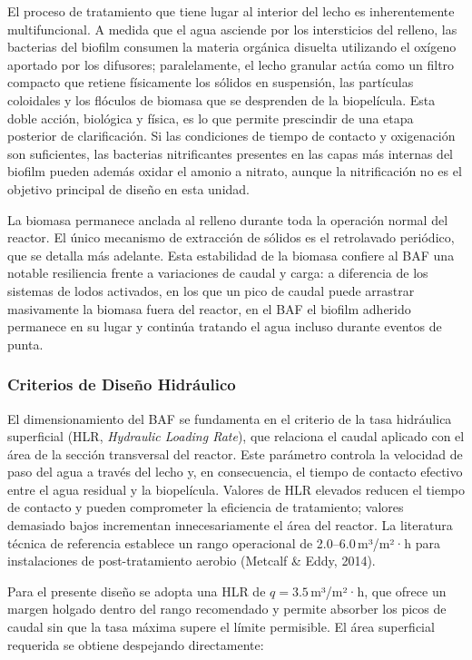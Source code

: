 El proceso de tratamiento que tiene lugar al interior del lecho es inherentemente multifuncional. A medida que el agua asciende por los intersticios del relleno, las bacterias del biofilm consumen la materia orgánica disuelta utilizando el oxígeno aportado por los difusores; paralelamente, el lecho granular actúa como un filtro compacto que retiene físicamente los sólidos en suspensión, las partículas coloidales y los flóculos de biomasa que se desprenden de la biopelícula. Esta doble acción, biológica y física, es lo que permite prescindir de una etapa posterior de clarificación. Si las condiciones de tiempo de contacto y oxigenación son suficientes, las bacterias nitrificantes presentes en las capas más internas del biofilm pueden además oxidar el amonio a nitrato, aunque la nitrificación no es el objetivo principal de diseño en esta unidad.

La biomasa permanece anclada al relleno durante toda la operación normal del reactor. El único mecanismo de extracción de sólidos es el retrolavado periódico, que se detalla más adelante. Esta estabilidad de la biomasa confiere al BAF una notable resiliencia frente a variaciones de caudal y carga: a diferencia de los sistemas de lodos activados, en los que un pico de caudal puede arrastrar masivamente la biomasa fuera del reactor, en el BAF el biofilm adherido permanece en su lugar y continúa tratando el agua incluso durante eventos de punta.

\subsubsection*{Criterios de Diseño Hidráulico}

El dimensionamiento del BAF se fundamenta en el criterio de la tasa hidráulica superficial (HLR, \textit{Hydraulic Loading Rate}), que relaciona el caudal aplicado con el área de la sección transversal del reactor. Este parámetro controla la velocidad de paso del agua a través del lecho y, en consecuencia, el tiempo de contacto efectivo entre el agua residual y la biopelícula. Valores de HLR elevados reducen el tiempo de contacto y pueden comprometer la eficiencia de tratamiento; valores demasiado bajos incrementan innecesariamente el área del reactor. La literatura técnica de referencia establece un rango operacional de 2.0--6.0\,m³/m²·h para instalaciones de post-tratamiento aerobio (Metcalf \& Eddy, 2014).

Para el presente diseño se adopta una HLR de $q = 3.5$\,m³/m²·h, que ofrece un margen holgado dentro del rango recomendado y permite absorber los picos de caudal sin que la tasa máxima supere el límite permisible. El área superficial requerida se obtiene despejando directamente:

